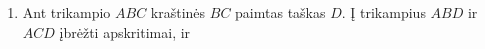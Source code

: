 \begin{enumerate}
  \item Ant trikampio $ABC$ kraštinės $BC$ paimtas taškas $D$.
    Į trikampius $ABD$ ir $ACD$ įbrėžti apskritimai, ir

\end{enumerate}
